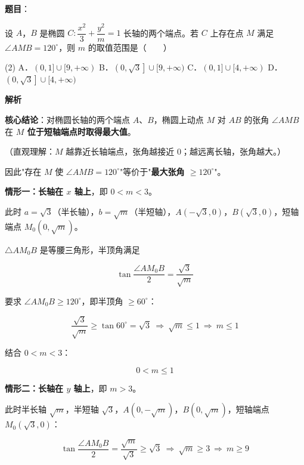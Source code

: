 \begin{answer}

\textbf{题目}：

设 $A$，$B$ 是椭圆 $C:\dfrac{x^{2}}3+\dfrac{y^{2}}m=1$ 长轴的两个端点。若 $C$ 上存在点 $M$ 满足 $\angle AMB=120^\circ$，则 $m$ 的取值范围是\mbox{（　　）}

\begin{gkopts}(2)
\task A．$(0,1]\cup[9,+\infty)$
\task B．$\left(0,\sqrt3\right]\cup[9,+\infty)$
\task C．$(0,1]\cup[4,+\infty)$
\task D．$\left(0,\sqrt3\right]\cup[4,+\infty)$
\end{gkopts}

\textbf{解析}

\textbf{核心结论}：对椭圆长轴的两个端点 $A$、$B$，椭圆上动点 $M$ 对 $AB$ 的张角 $\angle AMB$ 在 \textbf{$M$ 位于短轴端点时取得最大值}。

（直观理解：$M$ 越靠近长轴端点，张角越接近 $0$；越远离长轴，张角越大。）

因此"存在 $M$ 使 $\angle AMB=120^\circ$"等价于"\textbf{最大张角 $\ge120^\circ$}"。

\textbf{情形一：长轴在 $x$ 轴上}，即 $0<m<3$。

此时 $a=\sqrt3$（半长轴），$b=\sqrt m$（半短轴），$A\left(-\sqrt3,0\right)$，$B\left(\sqrt3,0\right)$，短轴端点 $M_0\left(0,\sqrt m\right)$。

$\triangle AM_0B$ 是等腰三角形，半顶角满足

\nopagebreak[4]
\[\tan\frac{\angle AM_0B}2=\frac{\sqrt3}{\sqrt m}\]

要求 $\angle AM_0B\ge120^\circ$，即半顶角 $\ge60^\circ$：

\nopagebreak[4]
\[\frac{\sqrt3}{\sqrt m}\ge\tan60^\circ=\sqrt3\ \Longrightarrow\ \sqrt m\le1\ \Longrightarrow\ m\le1\]

结合 $0<m<3$：

\nopagebreak[4]
\[0<m\le1\]

\Needspace{0.25\textheight}

\textbf{情形二：长轴在 $y$ 轴上}，即 $m>3$。

此时半长轴 $\sqrt m$，半短轴 $\sqrt3$，$A\left(0,-\sqrt m\right)$，$B\left(0,\sqrt m\right)$，短轴端点 $M_0\left(\sqrt3,0\right)$：

\nopagebreak[4]
\[\tan\frac{\angle AM_0B}2=\frac{\sqrt m}{\sqrt3}\ge\sqrt3\ \Longrightarrow\ \sqrt m\ge3\ \Longrightarrow\ m\ge9\]


\end{answer}
